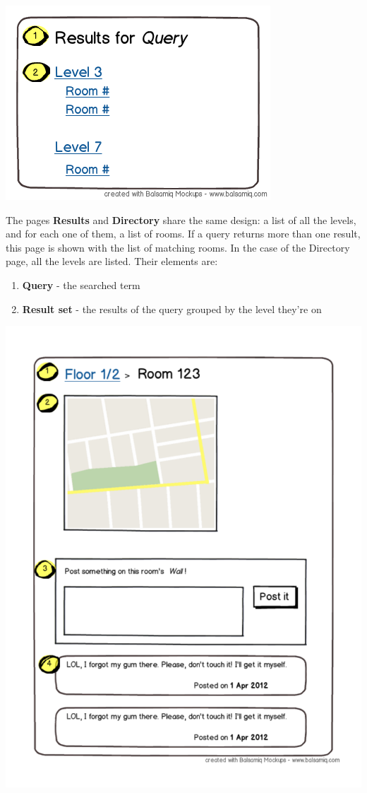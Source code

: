 \documentclass{sig-alt-release2}
\begin{document}
\begin{center}
\includegraphics[scale=0.5]{img/wireframes/results.png}
\end{center}


The pages \textbf{Results} and \textbf{Directory} share the same design:
a list of all the levels, and for each one of 
them, a list of rooms. If a query returns more than one result, this page is 
shown with the list of matching rooms. In the case of the Directory page, all 
the levels are listed. Their elements are:
\begin{enumerate} \itemsep1pt \parskip0pt 
	\item{\textbf{Query} - the searched term}
	\item{\textbf{Result set} - the results of the query grouped by the level
	they're on}
\end{enumerate}


\begin{center}
\includegraphics[scale=0.35]{img/wireframes/room.pdf}
\end{center}
\end{document}
